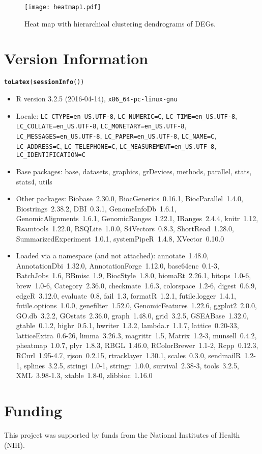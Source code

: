 \documentclass{article}\usepackage[]{graphicx}\usepackage[]{color}
\makeatletter
\newcommand{\hlstd}[1]{\textcolor[rgb]{0.345,0.345,0.345}{#1}}%
\newcommand{\hlkwd}[1]{\textcolor[rgb]{0.737,0.353,0.396}{\textbf{#1}}}%
\newenvironment{kframe}{%
 \def\at@end@of@kframe{}%
 \ifinner\ifhmode%
  \def\at@end@of@kframe{\end{minipage}}%
  \begin{minipage}{\columnwidth}%
 \fi\fi%
 \def\FrameCommand##1{\hskip\@totalleftmargin \hskip-\fboxsep
 \colorbox{shadecolor}{##1}\hskip-\fboxsep
     \hskip-\linewidth \hskip-\@totalleftmargin \hskip\columnwidth}%
 \MakeFramed {\advance\hsize-\width
   \@totalleftmargin\z@ \linewidth\hsize
   \@setminipage}}%
 {\par\unskip\endMakeFramed%
 \at@end@of@kframe}
\makeatother
\begin{document}
\begin{figure}[H]
  \centering
   \texttt{[image: heatmap1.pdf]}
   \caption{Heat map with hierarchical clustering dendrograms of DEGs.}
   \label{fig:heatmap}
\end{figure}

\section{Version Information}
\begin{kframe}
\begin{alltt}
\hlkwd{toLatex}\hlstd{(}\hlkwd{sessionInfo}\hlstd{())}
\end{alltt}
\end{kframe}\begin{itemize}\raggedright
  \item R version 3.2.5 (2016-04-14), \verb|x86_64-pc-linux-gnu|
  \item Locale: \verb|LC_CTYPE=en_US.UTF-8|, \verb|LC_NUMERIC=C|, \verb|LC_TIME=en_US.UTF-8|, \verb|LC_COLLATE=en_US.UTF-8|, \verb|LC_MONETARY=en_US.UTF-8|, \verb|LC_MESSAGES=en_US.UTF-8|, \verb|LC_PAPER=en_US.UTF-8|, \verb|LC_NAME=C|, \verb|LC_ADDRESS=C|, \verb|LC_TELEPHONE=C|, \verb|LC_MEASUREMENT=en_US.UTF-8|, \verb|LC_IDENTIFICATION=C|
  \item Base packages: base, datasets, graphics, grDevices, methods, parallel,
    stats, stats4, utils
  \item Other packages: Biobase~2.30.0, BiocGenerics~0.16.1, BiocParallel~1.4.0,
    Biostrings~2.38.2, DBI~0.3.1, GenomeInfoDb~1.6.1, GenomicAlignments~1.6.1,
    GenomicRanges~1.22.1, IRanges~2.4.4, knitr~1.12, Rsamtools~1.22.0,
    RSQLite~1.0.0, S4Vectors~0.8.3, ShortRead~1.28.0, SummarizedExperiment~1.0.1,
    systemPipeR~1.4.8, XVector~0.10.0
  \item Loaded via a namespace (and not attached): annotate~1.48.0,
    AnnotationDbi~1.32.0, AnnotationForge~1.12.0, base64enc~0.1-3, BatchJobs~1.6,
    BBmisc~1.9, BiocStyle~1.8.0, biomaRt~2.26.1, bitops~1.0-6, brew~1.0-6,
    Category~2.36.0, checkmate~1.6.3, colorspace~1.2-6, digest~0.6.9, edgeR~3.12.0,
    evaluate~0.8, fail~1.3, formatR~1.2.1, futile.logger~1.4.1,
    futile.options~1.0.0, genefilter~1.52.0, GenomicFeatures~1.22.6, ggplot2~2.0.0,
    GO.db~3.2.2, GOstats~2.36.0, graph~1.48.0, grid~3.2.5, GSEABase~1.32.0,
    gtable~0.1.2, highr~0.5.1, hwriter~1.3.2, lambda.r~1.1.7, lattice~0.20-33,
    latticeExtra~0.6-26, limma~3.26.3, magrittr~1.5, Matrix~1.2-3, munsell~0.4.2,
    pheatmap~1.0.7, plyr~1.8.3, RBGL~1.46.0, RColorBrewer~1.1-2, Rcpp~0.12.3,
    RCurl~1.95-4.7, rjson~0.2.15, rtracklayer~1.30.1, scales~0.3.0, sendmailR~1.2-1,
    splines~3.2.5, stringi~1.0-1, stringr~1.0.0, survival~2.38-3, tools~3.2.5,
    XML~3.98-1.3, xtable~1.8-0, zlibbioc~1.16.0
\end{itemize}


\section{Funding}
This project was supported by funds from the National Institutes of Health (NIH).


\end{document}
